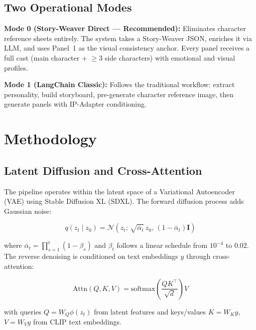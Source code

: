 \documentclass[11pt,a4paper,twocolumn]{article}
\begin{document}
\subsection{Two Operational Modes}

\textbf{Mode 0 (Story-Weaver Direct --- Recommended):} Eliminates character reference sheets entirely. The system takes a Story-Weaver JSON, enriches it via LLM, and uses Panel~1 as the visual consistency anchor. Every panel receives a full cast (main character + $\geq$3 side characters) with emotional and visual profiles.

\textbf{Mode 1 (LangChain Classic):} Follows the traditional workflow: extract personality, build storyboard, pre-generate character reference image, then generate panels with IP-Adapter conditioning.

\section{Methodology}
\label{sec:methodology}

\subsection{Latent Diffusion and Cross-Attention}

The pipeline operates within the latent space of a Variational Autoencoder (VAE) using Stable Diffusion XL (SDXL). The forward diffusion process adds Gaussian noise:

\begin{equation}
q(z_t \mid z_0) = \mathcal{N}\!\left(z_t;\, \sqrt{\bar{\alpha}_t}\, z_0,\, (1 - \bar{\alpha}_t)\mathbf{I}\right)
\label{eq:forward}
\end{equation}

\noindent where $\bar{\alpha}_t = \prod_{s=1}^{t}(1 - \beta_s)$ and $\beta_t$ follows a linear schedule from $10^{-4}$ to $0.02$. The reverse denoising is conditioned on text embeddings $y$ through cross-attention:

\begin{equation}
\text{Attn}(Q, K, V) = \text{softmax}\!\left(\frac{Q K^\top}{\sqrt{d}}\right)\!V
\label{eq:attention}
\end{equation}

\noindent with queries $Q = W_Q \phi(z_t)$ from latent features and keys/values $K = W_K y$, $V = W_V y$ from CLIP text embeddings.
\end{document}
